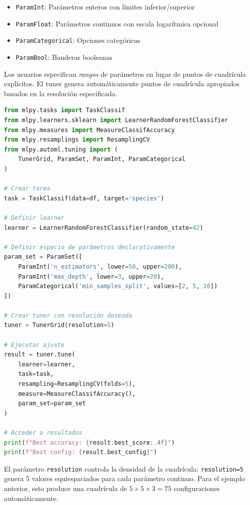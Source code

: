 \begin{itemize}
    \item \texttt{ParamInt}: Parámetros enteros con límites inferior/superior
    \item \texttt{ParamFloat}: Parámetros continuos con escala logarítmica opcional
    \item \texttt{ParamCategorical}: Opciones categóricas
    \item \texttt{ParamBool}: Banderas booleanas
\end{itemize}

Los usuarios especifican \emph{rangos} de parámetros en lugar de puntos de cuadrícula explícitos. El tuner genera automáticamente puntos de cuadrícula apropiados basados en la resolución especificada.

\begin{lstlisting}[language=Python, caption={Ajuste automático de hiperparámetros en MLPY para Random Forest}]
from mlpy.tasks import TaskClassif
from mlpy.learners.sklearn import LearnerRandomForestClassifier
from mlpy.measures import MeasureClassifAccuracy
from mlpy.resamplings import ResamplingCV
from mlpy.automl.tuning import (
    TunerGrid, ParamSet, ParamInt, ParamCategorical
)

# Crear tarea
task = TaskClassif(data=df, target='species')

# Definir learner
learner = LearnerRandomForestClassifier(random_state=42)

# Definir espacio de parámetros declarativamente
param_set = ParamSet([
    ParamInt('n_estimators', lower=50, upper=200),
    ParamInt('max_depth', lower=3, upper=20),
    ParamCategorical('min_samples_split', values=[2, 5, 10])
])

# Crear tuner con resolución deseada
tuner = TunerGrid(resolution=5)

# Ejecutar ajuste
result = tuner.tune(
    learner=learner,
    task=task,
    resampling=ResamplingCV(folds=5),
    measure=MeasureClassifAccuracy(),
    param_set=param_set
)

# Acceder a resultados
print(f"Best accuracy: {result.best_score:.4f}")
print(f"Best config: {result.best_config}")
\end{lstlisting}

El parámetro \texttt{resolution} controla la densidad de la cuadrícula: \texttt{resolution=5} genera 5 valores equiespaciados para cada parámetro continuo. Para el ejemplo anterior, esto produce una cuadrícula de $5 \times 5 \times 3 = 75$ configuraciones automáticamente.

